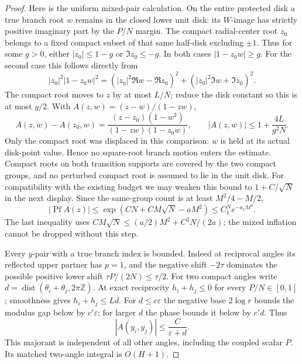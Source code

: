 \documentclass[11pt]{article}
\numberwithin{equation}{section}
\theoremstyle{definition}
\newcommand{\Z}{\mathbb Z}
\newcommand{\eps}{\varepsilon}
\newcommand{\Pf}{\operatorname{Pf}}
\newcommand{\dist}{\operatorname{dist}}
\begin{document}
\begin{proof}
Here is the uniform mixed-pair calculation. On the entire protected
disk a true branch root \(w\) remains in the closed lower unit disk:
its \(W\)-image has strictly positive imaginary part by the
\(P/N\) margin. The compact radial-center root \(z_0\) belongs to
a fixed compact subset of that same half-disk excluding \(\pm1\).
Thus for some \(g>0\), either \(|z_0|\le1-g\) or
\(\Im z_0\le-g\). In both cases \(|1-z_0w|\ge g\).
For the second case this follows directly from
\[
 |z_0|^2|1-z_0w|^2
 =(|z_0|^2\Re w-\Re z_0)^2+
   (|z_0|^2\Im w+\Im z_0)^2.
\]
The compact root moves to \(z\) by at most \(L/N\); reduce the
disk constant so this is at most \(g/2\). With
\(A(z,w)=(z-w)/(1-zw)\),
\[
 A(z,w)-A(z_0,w)=\frac{(z-z_0)(1-w^2)}{(1-zw)(1-z_0w)},\qquad
 |A(z,w)|\le1+\frac{4L}{g^2N}.
\]
Only the compact root was displaced in this comparison: \(w\)
is held at its actual disk-point value. Hence no square-root branch
motion enters the estimate. Compact roots on both transition supports
are covered by the two compact groups, and no perturbed compact root
is assumed to lie in the unit disk. For compatibility with the existing
budget we may weaken this bound to \(1+C/\sqrt N\) in the next display.
Since the same-group count is at least \(M^2/4-M/2\),
\[
 |\Pf A(z)|\le
 \exp(CN+CM\sqrt N-aM^2)\le C_1^N e^{-a_1M^2}.
\]
The last inequality uses
\(CM\sqrt N\le(a/2)M^2+C^2N/(2a)\); the mixed inflation cannot be
dropped without this step.

Every \(y\)-pair with a true branch index is bounded. Indeed at
reciprocal angles its reflected upper partner has \(p=1\), and
the negative shift \(-2\tau\) dominates the possible positive
lower shift \(\tau P/(2N)\le\tau/2\).
For two compact angles write
\(d=\dist(\theta_i+\theta_j,2\pi\Z)\).
At exact reciprocity \(h_i+h_j\le0\) for every \(P/N\in[0,1]\);
smoothness gives \(h_i+h_j\le Ld\).
For \(d\le c\eps\) the negative base \(2\log r\) bounds the
modulus gap below by \(c'\eps\); for larger \(d\) the phase
bounds it below by \(c'd\). Thus
\[
 |A(y_i,y_j)|\le\frac C{\eps+d}.
\]
This majorant is independent of all other angles, including the
coupled scalar \(P\). Its matched two-angle integral is \(O(H+1)\).


\end{proof}
\end{document}
